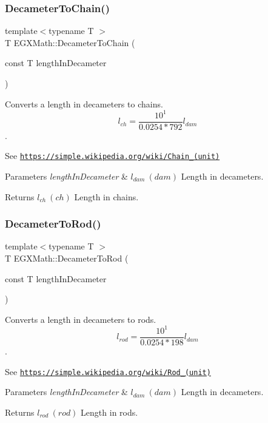 \subsubsection{\texorpdfstring{Decameter\+To\+Chain()}{DecameterToChain()}}
{\footnotesize\ttfamily template$<$typename T $>$ \\
T E\+G\+X\+Math\+::\+Decameter\+To\+Chain (\begin{DoxyParamCaption}\item[{const T}]{length\+In\+Decameter }\end{DoxyParamCaption})}



Converts a length in decameters to chains. \[ l_{ch}= \frac{10^{1}}{0.0254 * 792} l_{dam} \]. 

See \href{https://simple.wikipedia.org/wiki/Chain_(unit)}{\tt https\+://simple.\+wikipedia.\+org/wiki/\+Chain\+\_\+(unit)} 
\begin{DoxyParams}{Parameters}
{\em length\+In\+Decameter} & $ l_{dam}\ (dam)$ Length in decameters. \\
\hline
\end{DoxyParams}
\begin{DoxyReturn}{Returns}
$ l_{ch}\ (ch)$ Length in chains. 
\end{DoxyReturn}
\mbox{\label{group___e_g_x_math-_conversions-_length_conversions-_s_i-_decameter-_surveyors_ga0a6de708486617662fba474b67c8faa5}} 
\subsubsection{\texorpdfstring{Decameter\+To\+Rod()}{DecameterToRod()}}
{\footnotesize\ttfamily template$<$typename T $>$ \\
T E\+G\+X\+Math\+::\+Decameter\+To\+Rod (\begin{DoxyParamCaption}\item[{const T}]{length\+In\+Decameter }\end{DoxyParamCaption})}



Converts a length in decameters to rods. \[ l_{rod}= \frac{10^{1}}{0.0254 * 198} l_{dam} \]. 

See \href{https://simple.wikipedia.org/wiki/Rod_(unit)}{\tt https\+://simple.\+wikipedia.\+org/wiki/\+Rod\+\_\+(unit)} 
\begin{DoxyParams}{Parameters}
{\em length\+In\+Decameter} & $ l_{dam}\ (dam)$ Length in decameters. \\
\hline
\end{DoxyParams}
\begin{DoxyReturn}{Returns}
$ l_{rod}\ (rod)$ Length in rods. 
\end{DoxyReturn}
